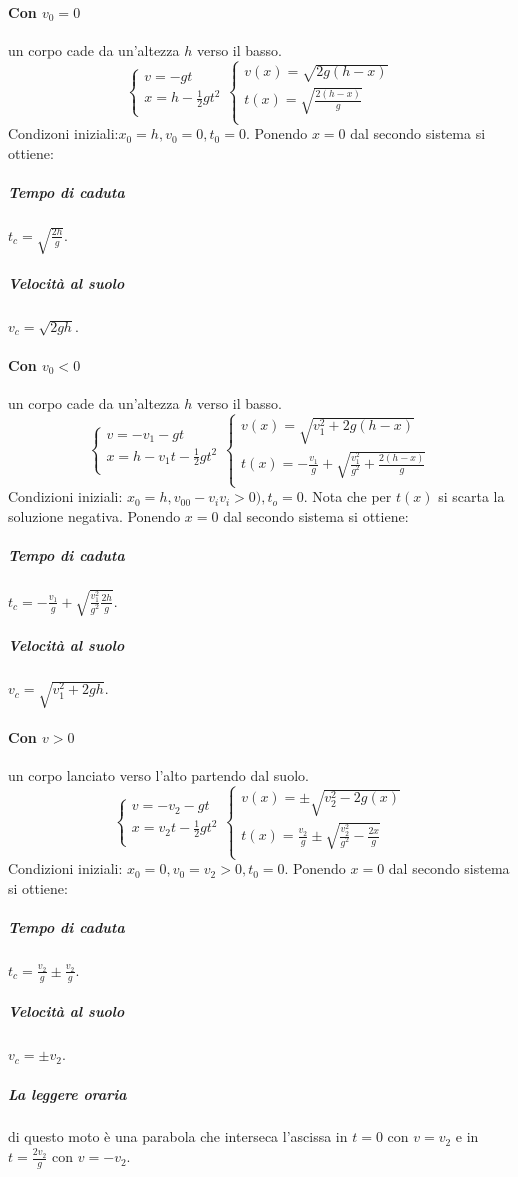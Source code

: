 \paragraph{Con $v_0=0$} un corpo cade da un'altezza $h$ verso il basso.
\[
\begin{cases}
	v=-gt\\
	x=h-\frac{1}{2}gt^2\\
\end{cases}
\begin{cases}
	v(x)=\sqrt{2g(h-x)}\\
	t(x)=\sqrt{\frac{2(h-x)}{g}}\\
\end{cases}
\]
Condizoni iniziali:$x_0=h, v_0=0, t_0=0$.
Ponendo $x=0$ dal secondo sistema si ottiene:
\subparagraph{Tempo di caduta} $t_c=\sqrt{\frac{2h}{g}}$.
\subparagraph{Velocità al suolo} $v_c=\sqrt{2gh}$.
\paragraph{Con $v_0<0$} un corpo cade da un'altezza $h$ verso il basso.
\[
\begin{cases}
	v=-v_1-gt\\
	x=h-v_1t-\frac{1}{2}gt^2\\
\end{cases}
\begin{cases}
	v(x)=\sqrt{v_1^2+2g(h-x)}\\
	t(x)=-\frac{v_1}{g}+\sqrt{\frac{v_1^2}{g^2}+\frac{2(h-x)}{g}}\\
\end{cases}
\]
Condizioni iniziali: $x_0=h, v_00-v_iv_i>0), t_o=0$. Nota che per $t(x)$ si scarta la soluzione negativa.
Ponendo $x=0$ dal secondo sistema si ottiene:
\subparagraph{Tempo di caduta} $t_c=-\frac{v_1}{g}+\sqrt{\frac{v_1^2}{g^2}\frac{2h}{g}}$.
\subparagraph{Velocità al suolo} $v_c=\sqrt{v_1^2+2gh}$.
\paragraph{Con $v>0$} un corpo lanciato verso l'alto partendo dal suolo.
\[
\begin{cases}
	v = -v_2-gt\\
	x = v_2t-\frac{1}{2}gt^2\\
\end{cases}
\begin{cases}
	v(x)=\pm\sqrt{v_2^2-2g(x)}\\
	t(x)=\frac{v_2}{g}\pm\sqrt{\frac{v_2^2}{g^2}-\frac{2x}{g}}\\
\end{cases}
\]
Condizioni iniziali: $x_0=0, v_0=v_2>0, t_0=0$.
Ponendo $x=0$ dal secondo sistema si ottiene:
\subparagraph{Tempo di caduta} $t_c=\frac{v_2}{g}\pm\frac{v_2}{g}$.
\subparagraph{Velocità al suolo} $v_c=\pm v_2$.
\subparagraph{La leggere oraria} di questo moto è una parabola che interseca l'ascissa in $t=0$ con $v=v_2$ e in $t=\frac{2v_2}{g}$ con $v=-v_2$.

